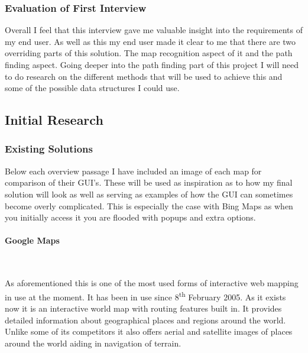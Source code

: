 \begin{flushleft}
            \subsubsection{Evaluation of First Interview}
            Overall I feel that this interview gave me valuable insight into the requirements of my end user. As well as this my end user made it clear to me that there are two overriding 
            parts of this solution. The map recognition aspect of it and the path finding aspect. Going deeper into the path finding part of this project I will need to do research on the 
            different methods that will be used to achieve this and some of the possible data structures I could use. \\
        \bk

        \subsection{Initial Research} 
            \subsubsection{Existing Solutions}
            Below each overview passage I have included an image of each map for comparison of their GUI's. These will be used as inspiration as to how my final solution will look as well 
            as serving as examples of how the GUI can sometimes become overly complicated. This is especially the case with Bing Maps as when you initially access it you are flooded with 
            popups and extra options. \\
            \paragraph{Google Maps} \mbox{} \\
            \bk
            
            As aforementioned this is one of the most used forms of interactive web mapping in use at the moment. It has been in use since 8\textsuperscript{th} February 2005. As it exists
            now it is an interactive world map with routing features built in. It provides detailed information about geographical places and regions around the world. Unlike some of its
            competitors it also offers aerial and satellite images of places around the world aiding in navigation of terrain. \\
            
            \bk
            

\end{flushleft}
